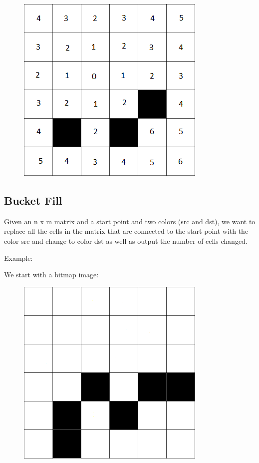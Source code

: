 \documentclass[11pt,oneside]{book}
\makeatletter
\def\maxwidth#1{\ifdim\Gin@nat@width>#1 #1\else\Gin@nat@width\fi}
\makeatother
\begin{document}
\vspace{5px}\begin{figure}[H]\centering
        \includegraphics[width=0.66\maxwidth{\textwidth}]{floodfill.png}
        \end{figure}

\subsection{Bucket Fill}

Given an n x m matrix and a start point and two colors (src and dst), we want to replace all the cells in the matrix that are connected to the start point with the color src and change to color dst as well as output the number of cells changed.

Example:

We start with a bitmap image:

\vspace{5px}\begin{figure}[H]\centering
        \includegraphics[width=0.66\maxwidth{\textwidth}]{bucket.png}
        \end{figure}
\end{document}
